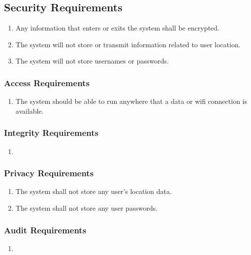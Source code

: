 \documentclass[titlepage]{article}
\begin{document}

\subsection{Security Requirements}
\label{sub:security_requirements}
\begin{enumerate}
\item
Any information that enters or exits the system shall be encrypted.
\item
The system will not store or transmit information related to user location.
\item
The system will not store usernames or passwords.
\end{enumerate}

\subsubsection{Access Requirements}
\label{ssub:access_requirements}
\begin{enumerate}[{SR}1. ]
	\item
	The system should be able to run anywhere that a data or wifi connection is available.
\end{enumerate}

\subsubsection{Integrity Requirements}
\label{ssub:integrity_requirements}
\begin{enumerate}[{SR}1. ]
	\item 
\end{enumerate}

\subsubsection{Privacy Requirements}
\label{ssub:privacy_requirements}
\begin{enumerate}[{SR}1. ]
	\item 
	The system shall not store any user's location data.
	\item
	The system shall not store any user passwords.
\end{enumerate}

\subsubsection{Audit Requirements}
\label{ssub:audit_requirements}
\begin{enumerate}[{SR}1. ]
	\item 
\end{enumerate}
\end{document}
